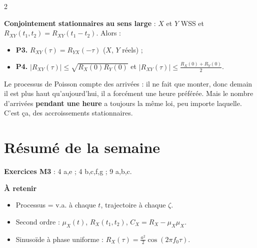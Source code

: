 \documentclass[a4paper,9pt]{extarticle}
\begin{document}
\begin{multicols}{2}
\begin{important}
\end{important}


\begin{definition}

\textbf{Conjointement stationnaires au sens large} : $X$ et $Y$ WSS et $R_{XY}(t_1,t_2) =
R_{XY}(t_1-t_2)$. Alors :

\begin{itemize}

\item \textbf{P3.} $R_{XY}(\tau) = R_{YX}(-\tau)$ ($X$, $Y$ réels) ;

\item \textbf{P4.} $|R_{XY}(\tau)| \le \sqrt{R_X(0)R_Y(0)}$ et $|R_{XY}(\tau)| \le
\frac{R_X(0) + R_Y(0)}2$.

\end{itemize}

\end{definition}


\begin{simple}

Le processus de Poisson compte des arrivées : il ne fait que monter, donc demain il est plus
haut qu'aujourd'hui, il a forcément une heure préférée. Mais le nombre d'arrivées
\textbf{pendant une heure} a toujours la même loi, peu importe laquelle. C'est ça, des
accroissements stationnaires.

\end{simple}


\section{Résumé de la semaine}


\begin{summary}

\textbf{Exercices M3} : 4 a,e ; 4 b,c,f,g ; 9 a,b,c.

\vspace{3pt}

\textbf{À retenir}

\begin{itemize}

\item Processus = v.a. à chaque $t$, trajectoire à chaque $\zeta$.

\item Second ordre : $\mu_X(t)$, $R_X(t_1,t_2)$, $C_X = R_X - \mu_X\mu_X$.

\item Sinusoïde à phase uniforme : $R_X(\tau) = \frac{a^2}2\cos(2\pi f_0\tau)$.


\end{itemize}
\end{summary}
\end{multicols}
\end{document}
